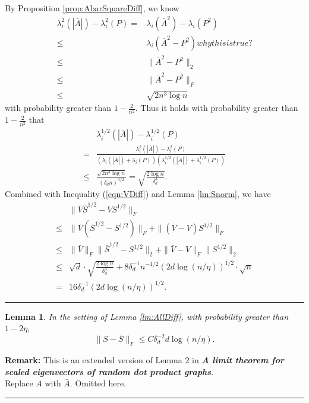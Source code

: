\documentclass[a4paper]{article}
\newenvironment{proof}{{\bf Proof:  }}{\hfill\rule{2mm}{2mm}}
\newtheorem{lemma}[fact]{Lemma}
\begin{document}
\begin{proof}
By Proposition \ref{prop:AbarSquareDiff}, we know
\begin{align*}
	\lambda_i^2(|\bar{A}|) - \lambda_i^2(P) = & \lambda_i(\bar{A}^2) - \lambda_i(P^2) \\
    \le & \lambda_i(\bar{A}^2 - P^2) why this is true? \\
    \le & \| \bar{A}^2 - P^2 \|_2 \\
    \le & \| \bar{A}^2 - P^2 \|_F \\
    \le & \sqrt{2 n^3 \log n}
\end{align*}
with probability greater than $1 - \frac{2}{n^2}$.
Thus it holds with probability greater than $1 - \frac{2}{n^2}$ that
\begin{align*}
	& \lambda_i^{1/2}(|\bar{A}|) - \lambda_i^{1/2}(P) \\
    = & \frac{\lambda_i^2(|\bar{A}|) - \lambda_i^2(P)}{\left(\lambda_i(|\bar{A}|) + \lambda_i(P)\right)\left(\lambda_i^{1/2}(|\bar{A}|) + \lambda_i^{1/2}(P)\right)} \\
    \le & \frac{\sqrt{2 n^3 \log n}}{(\delta_d n)^{3/2}}
    = \sqrt{\frac{2 \log n}{\delta_d^3}}.
\end{align*}
Combined with Inequality (\ref{eqn:VDiff}) and Lemma \ref{lm:Snorm}, we have
\begin{align*}
	& \|\bar{V} \bar{S}^{1/2} - V S^{1/2} \|_F \\
    \le & \| \bar{V} ( \bar{S}^{1/2} - S^{1/2} ) \|_F + \| ( \bar{V} - V) S^{1/2} \|_F \\
    \le & \|\bar{V}\|_F \|\bar{S}^{1/2} - S^{1/2}\|_2 + \| \bar{V} - V\|_F \|S^{1/2}\|_2 \\
    \le & \sqrt{d} \cdot \sqrt{\frac{2 \log n}{\delta_d^3}} + 8 \delta_d^{-1} n^{-1/2} (2d \log(n/\eta))^{1/2} \cdot \sqrt{n} \\
    = & 16 \delta_d^{-1} (2d \log(n/\eta))^{1/2}.
\end{align*}
\end{proof}









\begin{lemma}
\label{lm:SDiff}
In the setting of Lemma \ref{lm:AllDiff}, with probability greater than $1-2\eta$,
\[
	\|S - \bar{S}\|_F \le C \delta_d^{-2} d \log(n/\eta).
\]
\end{lemma}
\textbf{Remark:} This is an extended version of Lemma 2 in \textbf{\textit{A limit theorem for scaled eigenvectors of random dot product graphs}}. \\
\noindent
\begin{proof}
Replace $A$ with $\bar{A}$. Omitted here.
\end{proof}
\end{document}

